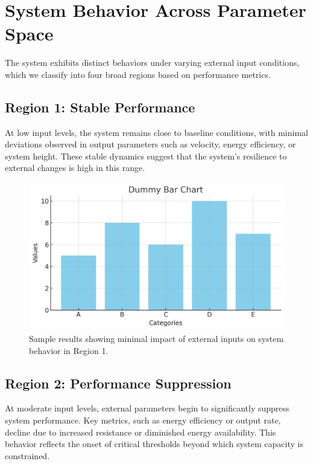 \section{System Behavior Across Parameter Space}
The system exhibits distinct behaviors under varying external input conditions, which we classify into four broad regions based on performance metrics.

\subsection*{Region 1: Stable Performance}
At low input levels, the system remains close to baseline conditions, with minimal deviations observed in output parameters such as velocity, energy efficiency, or system height. These stable dynamics suggest that the system's resilience to external changes is high in this range.

\begin{figure}[h!]
    \centering
    \includegraphics[width=130mm,scale=0.6]{body/images/placeholder_image2.png}
    \caption[Stable Dynamics]{Sample results showing minimal impact of external inputs on system behavior in Region 1.}
    \label{fig:region1_plot}
\end{figure}

\subsection*{Region 2: Performance Suppression}
At moderate input levels, external parameters begin to significantly suppress system performance. Key metrics, such as energy efficiency or output rate, decline due to increased resistance or diminished energy availability. This behavior reflects the onset of critical thresholds beyond which system capacity is constrained.

